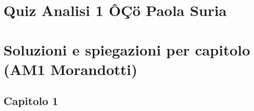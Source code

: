 \documentclass[11pt,a4paper]{article}
\newcounter{quiz}
\begin{document}
\section*{Quiz Analisi 1 ÔÇö Paola Suria}





















































\clearpage\section*{Soluzioni e spiegazioni per capitolo (AM1 Morandotti)}
\subsection*{Capitolo 1}
\end{document}
